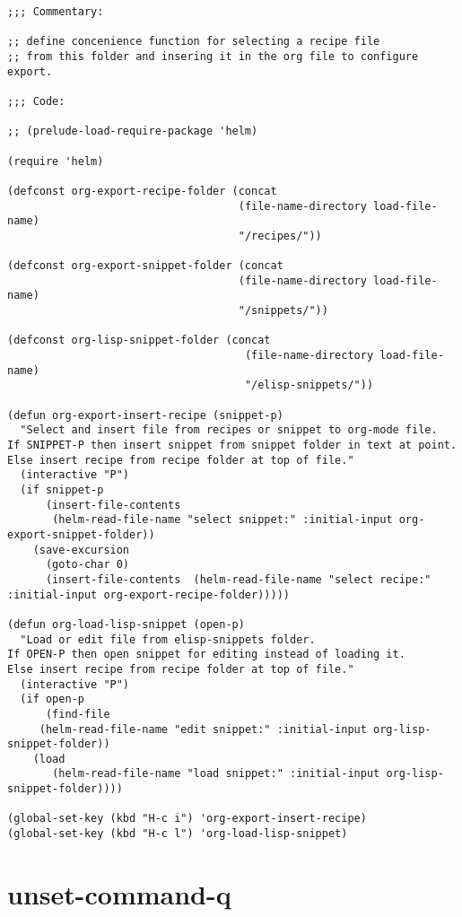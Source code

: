 \documentclass[11pt]{article}
\begin{document}
\begin{verbatim}
;;; Commentary:

;; define concenience function for selecting a recipe file
;; from this folder and insering it in the org file to configure export.

;;; Code:

;; (prelude-load-require-package 'helm)

(require 'helm)

(defconst org-export-recipe-folder (concat
                                    (file-name-directory load-file-name)
                                    "/recipes/"))

(defconst org-export-snippet-folder (concat
                                    (file-name-directory load-file-name)
                                    "/snippets/"))

(defconst org-lisp-snippet-folder (concat
                                     (file-name-directory load-file-name)
                                     "/elisp-snippets/"))

(defun org-export-insert-recipe (snippet-p)
  "Select and insert file from recipes or snippet to org-mode file.
If SNIPPET-P then insert snippet from snippet folder in text at point.
Else insert recipe from recipe folder at top of file."
  (interactive "P")
  (if snippet-p
      (insert-file-contents
       (helm-read-file-name "select snippet:" :initial-input org-export-snippet-folder))
    (save-excursion
      (goto-char 0)
      (insert-file-contents  (helm-read-file-name "select recipe:" :initial-input org-export-recipe-folder)))))

(defun org-load-lisp-snippet (open-p)
  "Load or edit file from elisp-snippets folder.
If OPEN-P then open snippet for editing instead of loading it.
Else insert recipe from recipe folder at top of file."
  (interactive "P")
  (if open-p
      (find-file
     (helm-read-file-name "edit snippet:" :initial-input org-lisp-snippet-folder))
    (load
       (helm-read-file-name "load snippet:" :initial-input org-lisp-snippet-folder))))

(global-set-key (kbd "H-c i") 'org-export-insert-recipe)
(global-set-key (kbd "H-c l") 'org-load-lisp-snippet)
\end{verbatim}

\section{unset-command-q}
\label{sec:orgc56b1b5}
\end{document}
